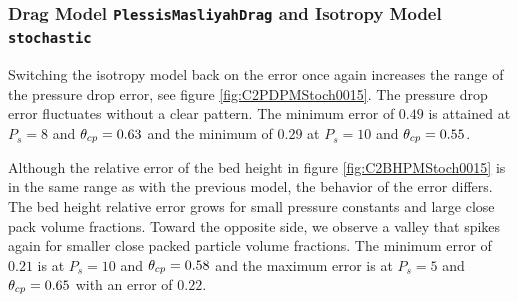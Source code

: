 

\subsubsection{Drag Model \lstinline|PlessisMasliyahDrag| and Isotropy Model \lstinline|stochastic|}




Switching the isotropy model back on the error once again increases the range of the pressure drop error, see figure \ref{fig:C2PDPMStoch0015}.
The pressure drop error fluctuates without a clear pattern. The minimum error of  $0.49$ is attained at $P_s = 8$ and $\theta_{cp} = 0.63$ and the minimum of $0.29$ at $P_s = 10$ and $\theta_{cp} = 0.55$.

Although the relative error of the bed height in figure \ref{fig:C2BHPMStoch0015} is in the same range as with the previous model, the behavior of the error differs.
The bed height relative error grows for small pressure constants and large close pack volume fractions. Toward the opposite side, we observe a valley that spikes again for smaller close packed particle volume fractions.
The minimum error of $0.21$ is at $P_s = 10$ and $\theta_{cp} = 0.58$ and the maximum error is at $P_s = 5$ and $\theta_{cp} = 0.65$ with an error of $0.22$.


